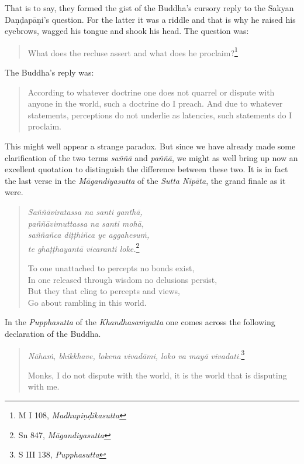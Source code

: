 That is to say, they formed the gist of the Buddha's cursory reply to the Sakyan Daṇḍapāṇi's question. For the latter it was a riddle and that is why he raised his eyebrows, wagged his tongue and shook his head. The question was:

\begin{quote}
What does the recluse assert and what does he proclaim?\footnote{M I 108, \emph{Madhupiṇḍikasutta}}
\end{quote}

The Buddha's reply was:

\begin{quote}
According to whatever doctrine one does not quarrel or dispute with anyone in the world, such a doctrine do I preach. And due to whatever statements, perceptions do not underlie as latencies, such statements do I proclaim.
\end{quote}

This might well appear a strange paradox. But since we have already made some clarification of the two terms \emph{saññā} and \emph{paññā}, we might as well bring up now an excellent quotation to distinguish the difference between these two. It is in fact the last verse in the \emph{Māgandiyasutta} of the \emph{Sutta Nipāta}, the grand finale as it were.

\begin{quote}
\emph{Saññāviratassa na santi ganthā,}\\
\emph{paññāvimuttassa na santi mohā,}\\
\emph{saññañca diṭṭhiñca ye aggahesuṁ,}\\
\emph{te ghaṭṭhayantā vicaranti loke.}\footnote{Sn 847, \emph{Māgandiyasutta}}

To one unattached to percepts no bonds exist,\\
In one released through wisdom no delusions persist,\\
But they that cling to percepts and views,\\
Go about rambling in this world.
\end{quote}

In the \emph{Pupphasutta} of the \emph{Khandhasaṁyutta} one comes across the following declaration of the Buddha.

\begin{quote}
\emph{Nāhaṁ, bhikkhave, lokena vivadāmi, loko va mayā vivadati.}\footnote{S III 138, \emph{Pupphasutta}}

Monks, I do not dispute with the world, it is the world that is disputing with me.
\end{quote}


